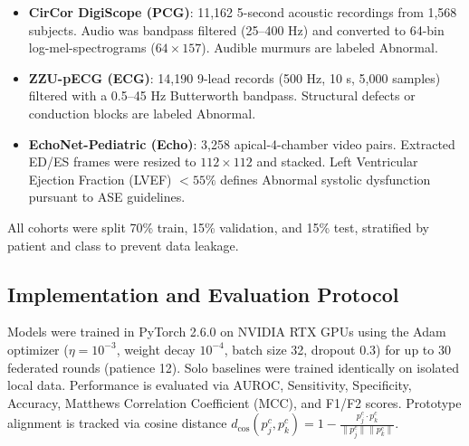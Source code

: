 \documentclass[conference]{IEEEtran}
\begin{document}
\begin{table}[htbp]
\centering
\caption{Multi-Center Pediatric Cohort Specifications}
\label{tab:datasets}
\end{table}

\begin{itemize}
    \item \textbf{CirCor DigiScope (PCG)}: 11,162 5-second acoustic recordings from 1,568 subjects. Audio was bandpass filtered (25--400 Hz) and converted to 64-bin log-mel-spectrograms ($64 \times 157$). Audible murmurs are labeled Abnormal.
    \item \textbf{ZZU-pECG (ECG)}: 14,190 9-lead records (500 Hz, 10 s, 5,000 samples) filtered with a 0.5--45 Hz Butterworth bandpass. Structural defects or conduction blocks are labeled Abnormal.
    \item \textbf{EchoNet-Pediatric (Echo)}: 3,258 apical-4-chamber video pairs. Extracted ED/ES frames were resized to $112 \times 112$ and stacked. Left Ventricular Ejection Fraction (LVEF) $<55\%$ defines Abnormal systolic dysfunction pursuant to ASE guidelines.
\end{itemize}
All cohorts were split 70\% train, 15\% validation, and 15\% test, stratified by patient and class to prevent data leakage.

\subsection{Implementation and Evaluation Protocol}
Models were trained in PyTorch 2.6.0 on NVIDIA RTX GPUs using the Adam optimizer ($\eta=10^{-3}$, weight decay $10^{-4}$, batch size 32, dropout 0.3) for up to 30 federated rounds (patience 12). Solo baselines were trained identically on isolated local data. Performance is evaluated via AUROC, Sensitivity, Specificity, Accuracy, Matthews Correlation Coefficient (MCC), and F1/F2 scores. Prototype alignment is tracked via cosine distance $d_{\cos}(p_j^c, p_k^c) = 1 - \frac{p_j^c \cdot p_k^c}{\|p_j^c\| \|p_k^c\|}$.
\end{document}
